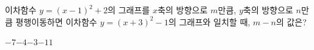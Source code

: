 이차함수 $y=(x-1)^2+2$의 그래프를 $x$축의 방향으로 $m$만큼, $y$축의 방향으로 $n$만큼 평행이동하면 이차함수 $y=(x+3)^2-1$의 그래프와 일치할 때, $m-n$의 값은?
\begin{choices32}{$-7$}{$-4$}{$-3$}{$-1$}{$1$}\end{choices32}
